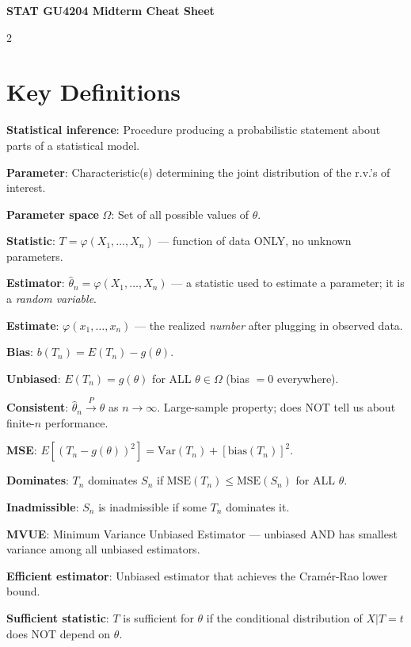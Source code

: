 \documentclass[8pt]{extarticle}
\begin{document}
\begin{center}
{\LARGE\bfseries STAT GU4204 Midterm Cheat Sheet}
\end{center}

\begin{multicols}{2}

\section{Key Definitions}

\textbf{Statistical inference}: Procedure producing a probabilistic statement about parts of a statistical model.

\textbf{Parameter}: Characteristic(s) determining the joint distribution of the r.v.'s of interest.

\textbf{Parameter space} $\Omega$: Set of all possible values of $\theta$.

\textbf{Statistic}: $T = \varphi(X_1,\ldots,X_n)$ --- function of data ONLY, no unknown parameters.

\textbf{Estimator}: $\hat\theta_n = \varphi(X_1,\ldots,X_n)$ --- a statistic used to estimate a parameter; it is a \emph{random variable}.

\textbf{Estimate}: $\varphi(x_1,\ldots,x_n)$ --- the realized \emph{number} after plugging in observed data.

\textbf{Bias}: $b(T_n) = E(T_n) - g(\theta)$.

\textbf{Unbiased}: $E(T_n) = g(\theta)$ for ALL $\theta \in \Omega$ (bias $= 0$ everywhere).

\textbf{Consistent}: $\hat\theta_n \xrightarrow{P} \theta$ as $n\to\infty$. Large-sample property; does NOT tell us about finite-$n$ performance.

\textbf{MSE}: $E[(T_n - g(\theta))^2] = \text{Var}(T_n) + [\text{bias}(T_n)]^2$.

\textbf{Dominates}: $T_n$ dominates $S_n$ if $\text{MSE}(T_n) \le \text{MSE}(S_n)$ for ALL $\theta$.

\textbf{Inadmissible}: $S_n$ is inadmissible if some $T_n$ dominates it.

\textbf{MVUE}: Minimum Variance Unbiased Estimator --- unbiased AND has smallest variance among all unbiased estimators.

\textbf{Efficient estimator}: Unbiased estimator that achieves the Cram\'er-Rao lower bound.

\textbf{Sufficient statistic}: $T$ is sufficient for $\theta$ if the conditional distribution of $X|T{=}t$ does NOT depend on $\theta$.


\end{multicols}
\end{document}

